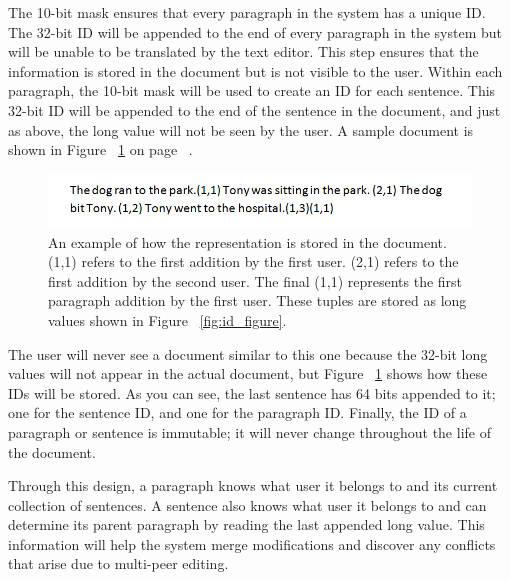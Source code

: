 The 10-bit mask ensures that every paragraph in the system has a unique ID. The 32-bit ID will be appended to the end of every paragraph in the system but will be unable to be translated by the text editor. This step ensures that the information is stored in the document but is not visible to the user. Within each paragraph, the 10-bit mask will be used to create an ID for each sentence. This 32-bit ID will be appended to the end of the sentence in the document, and just as above, the long value will not be seen by the user. A sample document is shown in Figure ~\ref{fig:file_figure} on page ~\pageref{fig:file_figure}.

\begin{figure}[t]
\includegraphics[scale=0.55]{Figure2.png}
\caption{An example of how the representation is stored in the document. (1,1) refers to the first addition by the first user. (2,1) refers to the first addition by the second user. The final (1,1) represents the first paragraph addition by the first user. These tuples are stored as long values shown in Figure ~\ref{fig:id_figure}.}
\label{fig:file_figure}
\end{figure}

The user will never see a document similar to this one because the 32-bit long values will not appear in the actual document, but Figure ~\ref{fig:file_figure} shows how these IDs will be stored. As you can see, the last sentence has 64 bits appended to it; one for the sentence ID, and one for the paragraph ID.  Finally, the ID of a paragraph or sentence is immutable; it will never change throughout the life of the document.

Through this design, a paragraph knows what user it belongs to and its current collection of sentences. A sentence also knows what user it belongs to and can determine its parent paragraph by reading the last appended long value. This information will help the system merge modifications and discover any conflicts that arise due to multi-peer editing.
